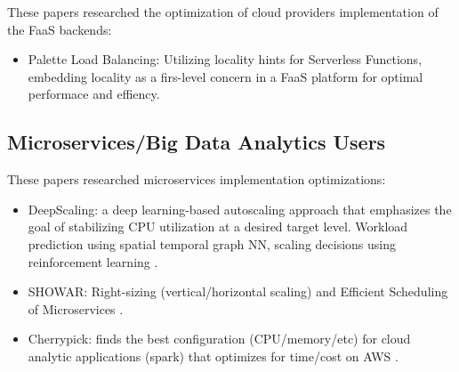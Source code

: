 \documentclass[conference]{IEEEtran}
\begin{document}
These papers researched the optimization of cloud providers implementation of the FaaS backends:
\begin{itemize}
    \item Palette Load Balancing: Utilizing locality hints for Serverless Functions, embedding locality as a firs-level concern in a FaaS platform for optimal performace and effiency.
\end{itemize}

\subsection{Microservices/Big Data Analytics Users}

These papers researched microservices implementation optimizations:
\begin{itemize}
    \item DeepScaling: a deep learning-based autoscaling approach that emphasizes the goal of stabilizing CPU utilization at a desired target level. Workload prediction using spatial temporal graph NN, scaling decisions using reinforcement learning \cite{10.1145/3542929.3563469} .
    \item SHOWAR: Right-sizing (vertical/horizontal scaling) and Efficient Scheduling of Microservices \cite{10.1145/3472883.3486999} .
    \item Cherrypick: finds the best configuration (CPU/memory/etc) for cloud analytic applications (spark) that optimizes for time/cost on AWS \cite{10.5555/3154630.3154669} .
\end{itemize}

\vspace{12pt}




\end{document}
